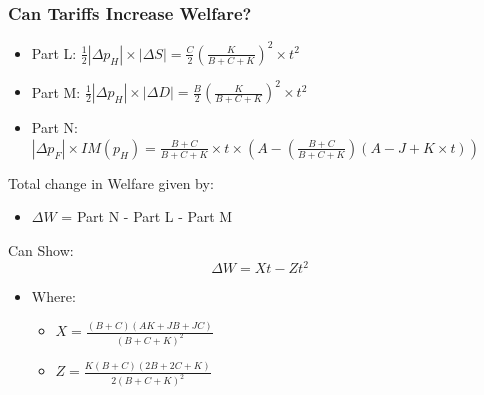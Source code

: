 \documentclass{beamer}
\begin{document}
\begin{frame}
	\frametitle{Can Tariffs Increase Welfare?}
	\scriptsize

	\begin{itemize}
		\scriptsize
		\item  Part L:  $\frac{1}{2}|\Delta p_H|\times |\Delta S|=\frac{C}{2}\left(\frac{K}{B+C+K}\right)^2\times t^2$ 
		\item  Part M: $\frac{1}{2}|\Delta p_H|\times |\Delta D|= \frac{B}{2}\left(\frac{K}{B+C+K}\right)^2\times t^2$ 
		\item  Part N: $|\Delta p_F| \times IM(p_H)=\frac{B+C}{B+C+K}\times t\times\left(A - \left(\frac{B+C}{B+C+K}\right)\left(A-J + K\times t\right)\right)$ 
	\end{itemize}
Total change in Welfare given by:
	\begin{itemize}
		\scriptsize
		\item  $\Delta W$ = Part N - Part L - Part M
	\end{itemize}
\vspace{3mm}Can Show:
\begin{equation}
\Delta W = Xt - Zt^2 \nonumber
\end{equation}
	\begin{itemize}
		\item Where:
			\begin{itemize}
				\item $X =\frac{(B+C)(AK+JB+JC)}{\left(B+C+K\right)^2}$
				\item $Z = \frac{K(B+C)\left(2B+2C + K \right)}{2\left(B+C+K\right)^2}$
			\end{itemize}
	\end{itemize}

\end{frame}
\end{document}
